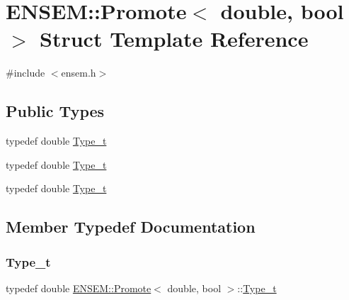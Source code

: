 \hypertarget{structENSEM_1_1Promote_3_01double_00_01bool_01_4}{}\section{E\+N\+S\+EM\+:\+:Promote$<$ double, bool $>$ Struct Template Reference}
\label{structENSEM_1_1Promote_3_01double_00_01bool_01_4}


{\ttfamily \#include $<$ensem.\+h$>$}

\subsection*{Public Types}
\begin{DoxyCompactItemize}
\item 
typedef double \mbox{\hyperlink{structENSEM_1_1Promote_3_01double_00_01bool_01_4_a14edc84a3688511a1539a90f9f319384}{Type\+\_\+t}}
\item 
typedef double \mbox{\hyperlink{structENSEM_1_1Promote_3_01double_00_01bool_01_4_a14edc84a3688511a1539a90f9f319384}{Type\+\_\+t}}
\item 
typedef double \mbox{\hyperlink{structENSEM_1_1Promote_3_01double_00_01bool_01_4_a14edc84a3688511a1539a90f9f319384}{Type\+\_\+t}}
\end{DoxyCompactItemize}


\subsection{Member Typedef Documentation}
\mbox{\label{structENSEM_1_1Promote_3_01double_00_01bool_01_4_a14edc84a3688511a1539a90f9f319384}} 
\subsubsection{\texorpdfstring{Type\_t}{Type\_t}\hspace{0.1cm}{\footnotesize\ttfamily [1/3]}}
{\footnotesize\ttfamily typedef double \mbox{\hyperlink{structENSEM_1_1Promote}{E\+N\+S\+E\+M\+::\+Promote}}$<$ double, bool $>$\+::\mbox{\hyperlink{structENSEM_1_1Promote_3_01double_00_01bool_01_4_a14edc84a3688511a1539a90f9f319384}{Type\+\_\+t}}}

